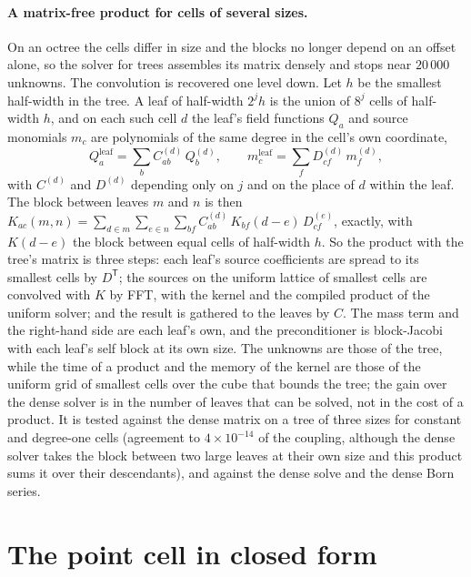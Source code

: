 \documentclass[11pt,a4paper]{article}
\begin{document}
\paragraph{A matrix-free product for cells of several sizes.} On an octree the cells differ in size and
the blocks no longer depend on an offset alone, so the solver for trees assembles its matrix densely and
stops near $20\,000$ unknowns. The convolution is recovered one level down. Let $h$ be the smallest
half-width in the tree. A leaf of half-width $2^jh$ is the union of $8^j$ cells of half-width $h$, and
on each such cell $d$ the leaf's field functions $Q_a$ and source monomials $m_c$ are polynomials of
the same degree in the cell's own coordinate,
\begin{equation}\label{eq:reexpand}
Q_a^{\text{leaf}}=\sum_b C^{(d)}_{ab}\,Q_b^{(d)},\qquad m_c^{\text{leaf}}=\sum_f D^{(d)}_{cf}\,m_f^{(d)},
\end{equation}
with $C^{(d)}$ and $D^{(d)}$ depending only on $j$ and on the place of $d$ within the leaf. The block
between leaves $m$ and $n$ is then
$K_{ac}(m,n)=\sum_{d\in m}\sum_{e\in n}\sum_{bf}C^{(d)}_{ab}\,K_{bf}(d-e)\,D^{(e)}_{cf}$, exactly, with
$K(d-e)$ the block between equal cells of half-width $h$. So the product with the tree's matrix is three
steps: each leaf's source coefficients are spread to its smallest cells by $D^{\mathsf T}$; the sources
on the uniform lattice of smallest cells are convolved with $K$ by FFT, with the kernel and the compiled
product of the uniform solver; and the result is gathered to the leaves by $C$. The mass term and the
right-hand side are each leaf's own, and the preconditioner is block-Jacobi with each leaf's self block
at its own size. The unknowns are those of the tree, while the time of a product and the memory of the
kernel are those of the uniform grid of smallest cells over the cube that bounds the tree; the gain over
the dense solver is in the number of leaves that can be solved, not in the cost of a product. It is
tested against the dense matrix on a tree of three sizes for constant and degree-one cells (agreement to
$4\times10^{-14}$ of the coupling, although the dense solver takes the block between two large leaves at
their own size and this product sums it over their descendants), and against the dense solve and the
dense Born series.

\section{The point cell in closed form}\label{app:pointcell}
\end{document}
